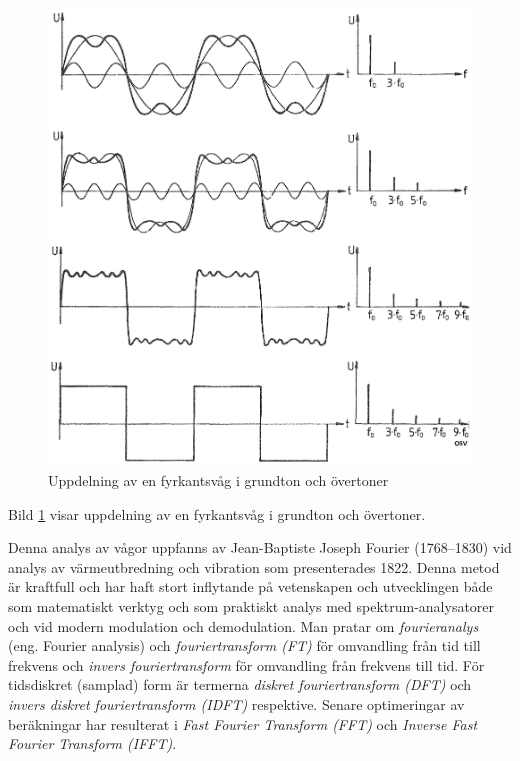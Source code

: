 \begin{figure}
\begin{center}
\includegraphics[width=\textwidth]{images/cropped_pdfs/bild_2_1-20.pdf}
\caption{Uppdelning av en fyrkantsvåg i grundton och övertoner}
\label{fig:BildII1-20}
\end{center}
\end{figure}

Bild \ref{fig:BildII1-20} visar uppdelning av en fyrkantsvåg i grundton och
övertoner.


Denna analys av vågor uppfanns av Jean-Baptiste Joseph Fourier (1768--1830)
vid analys av värmeutbredning och vibration som presenterades 1822.
Denna metod är kraftfull och har haft stort inflytande på vetenskapen och
utvecklingen både som matematiskt verktyg och som praktiskt analys med
spektrum-analysatorer och vid modern modulation och demodulation.
Man pratar om \emph{fourieranalys} (eng. Fourier analysis) och
\emph{fouriertransform (FT)} för omvandling från tid till frekvens och
\emph{invers fouriertransform} för omvandling från frekvens till tid.
För tidsdiskret (samplad) form är termerna
\emph{diskret fouriertransform (DFT)} och
\emph{invers diskret fouriertransform (IDFT)} respektive.
Senare optimeringar av beräkningar har resulterat i
\emph{Fast Fourier Transform (FFT)} och
\emph{Inverse Fast Fourier Transform (IFFT)}.

